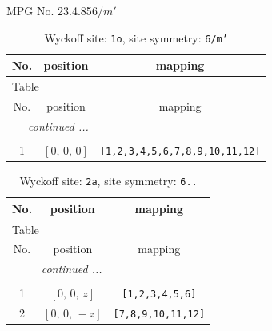 \documentclass[fleqn,8pt]{jsarticle}
\begin{document}
\setcounter{MaxMatrixCols}{32}

\renewcommand{\tablename}{Table~}
\renewcommand{\figurename}{Figure~}
\begin{center}
\LARGE
MPG No. 23.4.85\quad$6/m'$
\end{center}
\renewcommand{\arraystretch}{1.2}
\begin{longtable}{ccc}
\caption{Wyckoff site: {\tt 1o}, site symmetry: {\tt 6/m'}}
 \\
 \hline \hline
No. & position & mapping \\ \hline \endfirsthead

\multicolumn{2}{l}{\tablename\ \thetable{}} \\
 \hline \hline
No. & position & mapping \\ \hline \endhead

 \hline \hline
\multicolumn{2}{r}{\footnotesize\it continued ...} \\ \endfoot

 \hline \hline
\multicolumn{2}{r}{} \\ \endlastfoot

1 & $\left[ 0,\, 0,\, 0 \right]$ & {\tt [1,2,3,4,5,6,7,8,9,10,11,12]} \\
\end{longtable}
\renewcommand{\arraystretch}{1.2}
\begin{longtable}{ccc}
\caption{Wyckoff site: {\tt 2a}, site symmetry: {\tt 6..}}
 \\
 \hline \hline
No. & position & mapping \\ \hline \endfirsthead

\multicolumn{2}{l}{\tablename\ \thetable{}} \\
 \hline \hline
No. & position & mapping \\ \hline \endhead

 \hline \hline
\multicolumn{2}{r}{\footnotesize\it continued ...} \\ \endfoot

 \hline \hline
\multicolumn{2}{r}{} \\ \endlastfoot

1 & $\left[ 0,\, 0,\, z \right]$ & {\tt [1,2,3,4,5,6]} \\ \hline
2 & $\left[ 0,\, 0,\, - z \right]$ & {\tt [7,8,9,10,11,12]} \\
\end{longtable}
\renewcommand{\arraystretch}{1.2}
\end{document}
